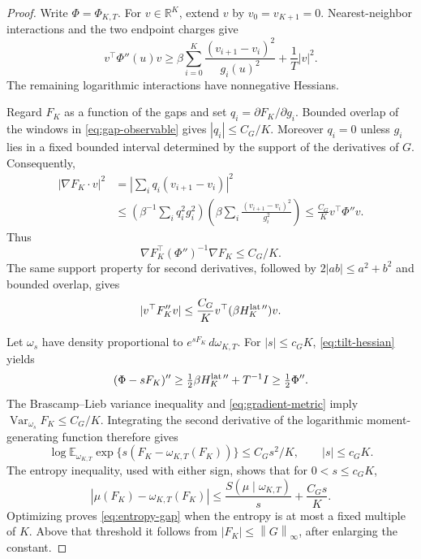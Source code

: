 \documentclass[11pt,reqno]{amsart}
\numberwithin{equation}{section}
\theoremstyle{definition}
\theoremstyle{remark}
\newcommand{\R}{\mathbb R}
\newcommand{\E}{\mathbb E}
\newcommand{\1}{\mathbf 1}
\newcommand{\Var}{\operatorname{Var}}
\newcommand{\dd}{\,d}
\newcommand{\norm}[1]{\left\lVert #1\right\rVert}
\newcommand{\abs}[1]{\left\lvert #1\right\rvert}
\begin{document}
\begin{proof}
Write $\Phi=\Phi_{K,T}$. For $v\in\R^K$, extend $v$ by
$v_0=v_{K+1}=0$. Nearest-neighbor interactions and the two endpoint
charges give
\begin{equation}\label{eq:hessian}
v^\top\Phi''(u)v
\ge\beta\sum_{i=0}^K
\frac{(v_{i+1}-v_i)^2}{g_i(u)^2}+\frac1T|v|^2.
\end{equation}
The remaining logarithmic interactions have nonnegative Hessians.

Regard $F_K$ as a function of the gaps and set
$q_i=\partial F_K/\partial g_i$. Bounded overlap of the windows in
\eqref{eq:gap-observable} gives $|q_i|\le C_G/K$. Moreover $q_i=0$
unless $g_i$ lies in a fixed bounded interval determined by the support
of the derivatives of $G$. Consequently,
\[
\begin{split}
|\nabla F_K\cdot v|^2
&=\abs{\sum_iq_i(v_{i+1}-v_i)}^2\\
&\le
\left(\beta^{-1}\sum_iq_i^2g_i^2\right)
\left(\beta\sum_i\frac{(v_{i+1}-v_i)^2}{g_i^2}\right)
\le \frac{C_G}{K}v^\top\Phi''v.
\end{split}
\]
Thus
\begin{equation}\label{eq:gradient-metric}
\nabla F_K^\top(\Phi'')^{-1}\nabla F_K\le C_G/K.
\end{equation}
The same support property for second derivatives, followed by
$2|ab|\le a^2+b^2$ and bounded overlap, gives
\begin{equation}\label{eq:tilt-hessian}
|v^\top F_K''v|
\le \frac{C_G}{K}
v^\top(\beta H_K^{{\rm lat}\,\prime\prime})v.
\end{equation}

Let $\omega_s$ have density proportional to $e^{sF_K}\dd\omega_{K,T}$.
For $|s|\le c_GK$, \eqref{eq:tilt-hessian} yields
\[
(\Phi-sF_K)''
\ge \tfrac12\beta H_K^{{\rm lat}\,\prime\prime}+T^{-1}I
\ge\tfrac12\Phi''.
\]
The Brascamp--Lieb variance inequality and
\eqref{eq:gradient-metric} imply
$\Var_{\omega_s}F_K\le C_G/K$. Integrating the second derivative of
the logarithmic moment-generating function therefore gives
\begin{equation}\label{eq:mgf}
\log\E_{\omega_{K,T}}
\exp\{s(F_K-\omega_{K,T}(F_K))\}
\le C_Gs^2/K,\qquad |s|\le c_GK.
\end{equation}
The entropy inequality, used with either sign, shows that for
$0<s\le c_GK$,
\[
|\mu(F_K)-\omega_{K,T}(F_K)|
\le \frac{S(\mu\mid\omega_{K,T})}{s}+\frac{C_Gs}{K}.
\]
Optimizing proves \eqref{eq:entropy-gap} when the entropy is at most a
fixed multiple of $K$. Above that threshold it follows from
$|F_K|\le\norm{G}_\infty$, after enlarging the constant.


\end{proof}
\end{document}
